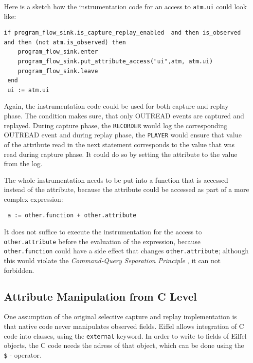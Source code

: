 Here is a sketch how the instrumentation code for an access to \texttt{atm.ui} could look like:
\begin{lstlisting}[caption=Instrumentation of an Attribute Access]
 if program_flow_sink.is_capture_replay_enabled  and then is_observed and then (not atm.is_observed) then
	program_flow_sink.enter
	program_flow_sink.put_attribute_access("ui",atm, atm.ui)
	program_flow_sink.leave
 end
 ui := atm.ui
\end{lstlisting}
Again, the instrumentation code could be used for both capture and replay phase. The condition makes sure, that only OUTREAD events are captured and replayed. During capture phase, the \texttt{RECORDER} would log the corresponding OUTREAD event and during replay phase, the \texttt{PLAYER} would ensure that value of the attribute read in the next statement corresponds to the value that was read during capture phase. It could do so by setting the attribute to the value from the log.

The whole instrumentation needs to be put into a function that is accessed instead of the attribute, because the attribute could be accessed as part of a more complex expression:
\begin{lstlisting}
 a := other.function + other.attribute
\end{lstlisting}
It does not suffice to execute the instrumentation for the access to \texttt{other.attribute} before the evaluation of the expression, because \texttt{other.function} could have a side effect that changes \texttt{other.attribute}; although this would violate the \emph{Command-Query Separation Principle} \cite{oosc2}, it can not forbidden.

\subsection{Attribute Manipulation from C Level}
One assumption of the original selective capture and replay implementation is that native code never manipulates observed fields. Eiffel allows integration of C code into classes, using the \texttt{external} keyword. In order to write to fields of Eiffel objects, the C code needs the adress of that object, which can be done using the \texttt{\$} - operator.

